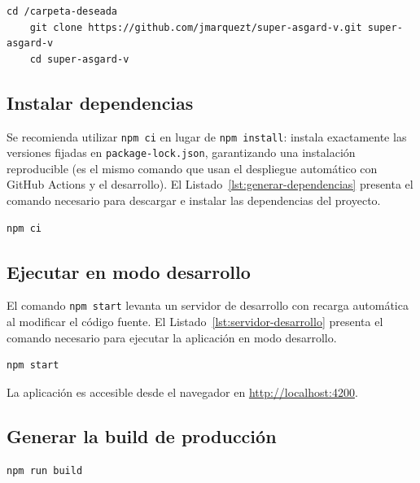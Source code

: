 \documentclass[../main.tex]{subfiles}
\begin{document}
\begin{lstlisting}[caption={Comandos para obtener el código fuente.},label={lst:obtener-codigo}]
	cd /carpeta-deseada
	git clone https://github.com/jmarquezt/super-asgard-v.git super-asgard-v
	cd super-asgard-v
\end{lstlisting}

\subsection{Instalar dependencias}

Se recomienda utilizar \texttt{npm ci} en lugar de \texttt{npm install}: instala exactamente las versiones fijadas en \texttt{package-lock.json}, garantizando una instalación reproducible (es el mismo comando que usan el despliegue automático con GitHub Actions y el desarrollo). El Listado~\ref{lst:generar-dependencias} presenta el comando necesario para descargar e instalar las dependencias del proyecto.

\begin{lstlisting}[caption={Comando para instalar las dependencias.},label={lst:generar-dependencias}]
	npm ci
\end{lstlisting}

\subsection{Ejecutar en modo desarrollo}

El comando \texttt{npm start} levanta un servidor de desarrollo con recarga automática al modificar el código fuente. El Listado~\ref{lst:servidor-desarrollo} presenta el comando necesario para ejecutar la aplicación en modo desarrollo.

\begin{lstlisting}[caption={Comando para levantar el servidor de desarrollo.},label={lst:servidor-desarrollo}]
	npm start
\end{lstlisting}

La aplicación es accesible desde el navegador en \url{http://localhost:4200}.

\subsection{Generar la build de producción}

\begin{lstlisting}[caption={Comando para compilar la aplicación en modo producción.},label={lst:compilar-produccion}]
	npm run build
\end{lstlisting}
\end{document}
